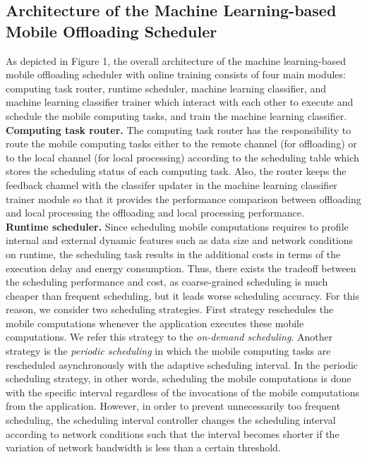 \documentclass[10pt, conference, compsocconf]{IEEEtran}
\begin{document}
\subsection{Architecture of the Machine Learning-based Mobile Offloading
Scheduler}
%
As depicted in Figure 1, the overall architecture of the machine
learning-based mobile offloading scheduler with online training consists
of four main modules: computing task router, runtime scheduler, machine
learning classifier, and machine learning classifier trainer which
interact with each other to execute and schedule the mobile computing
tasks, and train the machine learning classifier.\\
%
\textbf{Computing task router.} The computing task router has the
responsibility to route the mobile computing tasks either to the remote
channel (for offloading) or to the local channel (for local processing)
according to the scheduling table which stores the scheduling status of
each computing task.
%
Also, the router keeps the feedback channel with the classifer updater
in the machine learning classifier trainer module so that it provides
the performance comparison between offloading and local processing 
the offloading and local processing performance.\\
%
\textbf{Runtime scheduler.} Since scheduling mobile computations
requires to profile internal and external dynamic features such as data
size and network conditions on runtime, the scheduling task results in
the additional costs in terms of the execution delay and energy
consumption.
%
Thus, there exists the tradeoff between the scheduling performance and
cost, as coarse-grained scheduling is much cheaper than frequent
scheduling, but it leads worse scheduling accuracy.    
%
For this reason, we consider two scheduling strategies.
%
First strategy reschedules the mobile computations whenever the
application executes these mobile computations.
%
We refer this strategy to the \textit{on-demand scheduling}.
%
Another strategy is the \textit{periodic scheduling} in which the mobile
computing tasks are rescheduled asynchronously with the adaptive
scheduling interval.
%
In the periodic scheduling strategy, in other words, scheduling the mobile
computations is done with the specific interval regardless of the
invocations of the mobile computations from the application.
%
However, in order to prevent unnecessarily too frequent scheduling, the
scheduling interval controller changes the scheduling interval according
to network conditions such that the interval becomes shorter if the
variation of network bandwidth is less than a certain threshold.
\end{document}
